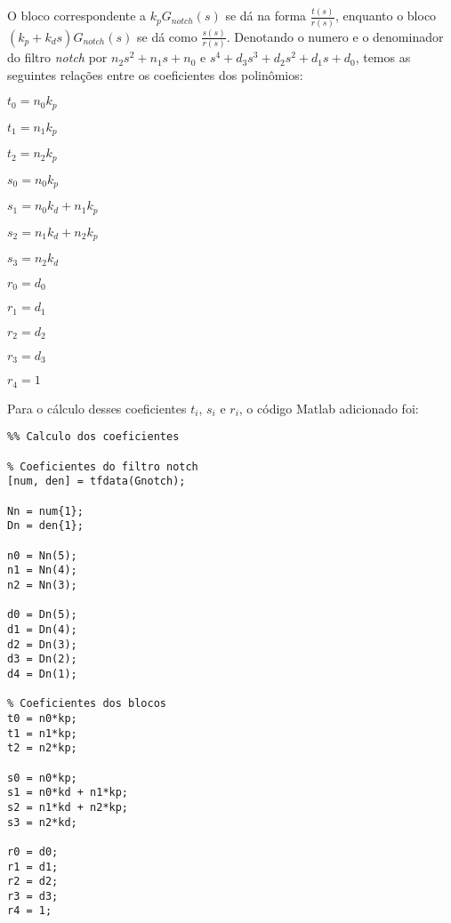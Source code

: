 \documentclass[a4paper,11pt]{article}
\begin{document}
O bloco correspondente a $k_p G_{notch}\left(s\right)$ se dá na forma
$\frac{t\left(s\right)}{r\left(s\right)}$, enquanto o bloco
$\left(k_p + k_d s\right) G_{notch}\left(s\right)$ se dá como
$\frac{s\left(s\right)}{r\left(s\right)}$. Denotando o numero e o denominador do
filtro \textit{notch} por $n_2 s^2 + n_1 s + n_0$ e
$s^4 + d_3 s^3 + d_2 s^2 + d_1 s + d_0$, temos as seguintes relações entre os
coeficientes dos polinômios:

\begin{multicols}{3}
$t_0 = n_0 k_p$

$t_1 = n_1 k_p$

$t_2 = n_2 k_p$

\columnbreak

$s_0 = n_0 k_p$

$s_1 = n_0 k_d + n_1 k_p$

$s_2 = n_1 k_d + n_2 k_p$

$s_3 = n_2 k_d$

\columnbreak

$r_0 = d_0$

$r_1 = d_1$

$r_2 = d_2$

$r_3 = d_3$

$r_4 = 1$
\end{multicols}

Para o cálculo desses coeficientes $t_i$, $s_i$ e $r_i$, o código Matlab
adicionado foi:

\begin{lstlisting}
%% Calculo dos coeficientes

% Coeficientes do filtro notch
[num, den] = tfdata(Gnotch);

Nn = num{1};
Dn = den{1};

n0 = Nn(5);
n1 = Nn(4);
n2 = Nn(3);

d0 = Dn(5);
d1 = Dn(4);
d2 = Dn(3);
d3 = Dn(2);
d4 = Dn(1);

% Coeficientes dos blocos
t0 = n0*kp;
t1 = n1*kp;
t2 = n2*kp;

s0 = n0*kp;
s1 = n0*kd + n1*kp;
s2 = n1*kd + n2*kp;
s3 = n2*kd;

r0 = d0;
r1 = d1; 
r2 = d2;
r3 = d3;
r4 = 1;
\end{lstlisting}
\end{document}

